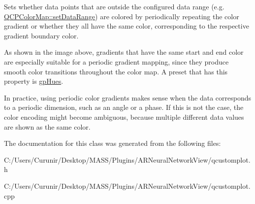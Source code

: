 Sets whether data points that are outside the configured data range (e.\+g. \hyperlink{class_q_c_p_color_map_a980b42837821159786a85b4b7dcb8774}{Q\+C\+P\+Color\+Map\+::set\+Data\+Range}) are colored by periodically repeating the color gradient or whether they all have the same color, corresponding to the respective gradient boundary color.



As shown in the image above, gradients that have the same start and end color are especially suitable for a periodic gradient mapping, since they produce smooth color transitions throughout the color map. A preset that has this property is \hyperlink{class_q_c_p_color_gradient_aed6569828fee337023670272910c9072aa9382f15c19d131045d8ee3b4a40b799}{gp\+Hues}.

In practice, using periodic color gradients makes sense when the data corresponds to a periodic dimension, such as an angle or a phase. If this is not the case, the color encoding might become ambiguous, because multiple different data values are shown as the same color. 

The documentation for this class was generated from the following files\+:\begin{DoxyCompactItemize}
\item 
C\+:/\+Users/\+Curunir/\+Desktop/\+M\+A\+S\+S/\+Plugins/\+A\+R\+Neural\+Network\+View/qcustomplot.\+h\item 
C\+:/\+Users/\+Curunir/\+Desktop/\+M\+A\+S\+S/\+Plugins/\+A\+R\+Neural\+Network\+View/qcustomplot.\+cpp\end{DoxyCompactItemize}

